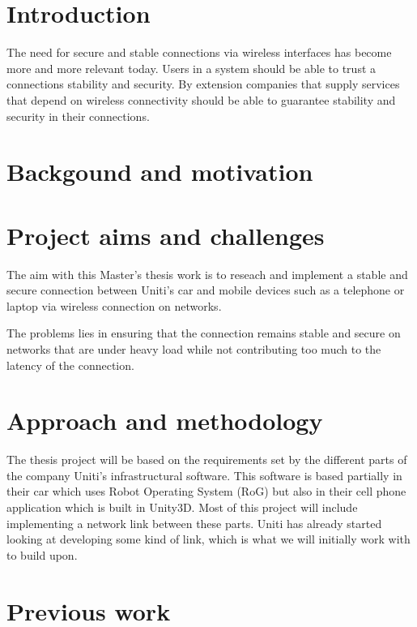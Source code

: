 \documentclass[a4paper]{article}
\begin{document}
\section{Introduction}
The need for secure and stable connections via wireless interfaces has become
more and more relevant today.  Users in a system should be able to trust a
connections stability and security. By extension companies that supply services
that depend on wireless connectivity should be able to guarantee stability
and security in their connections.


\section{Backgound and motivation}




\section{Project aims and challenges}

The aim with this Master's thesis work is to reseach and implement a stable and
secure connection between Uniti's car and mobile devices such as a telephone or
laptop via wireless connection on networks.

The problems lies in ensuring that the connection remains stable and secure on
networks that are under heavy load while not contributing too much to the
latency of the connection.

\section{Approach and methodology}
The thesis project will be based on the requirements set by the different parts
of the company Uniti's infrastructural software. This software is based
partially in their car which uses Robot Operating System (RoG) but also in
their cell phone application which is built in Unity3D. Most of this project
will include implementing a network link between these parts. Uniti has
already started looking at developing some kind of link, which is what
we will initially work with to build upon.


\section{Previous work}
\end{document}

